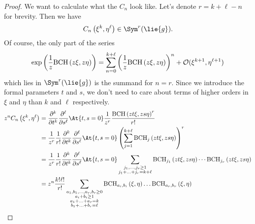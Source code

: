 \begin{proof}
	We want to calculate what the $C_n$ look like. Let's denote $r = k 
	+ \ell - n$ for brevity. Then we have
	\begin{equation*}
		C_n \left( \xi^k, \eta^{\ell} \right)
		\in \Sym^r(\lie{g}).
	\end{equation*}
	Of course, the only part of the series
	\begin{equation*}
		\exp\left(
			\frac{1}{z} \mathrm{BCH}\left(z \xi, z \eta\right)
		\right)
		=
		\sum\limits_{n = 0}^{k + \ell}
		\left(
			\frac{1}{z} \mathrm{BCH}\left(z \xi, z \eta\right)
		\right)^n
		+ \mathcal{O}(\xi^{k + 1}, \eta^{\ell + 1})
	\end{equation*} which lies in $\Sym^r(\lie{g})$ is the summand for 
	$n = r $. Since we introduce the formal parameters $t$ and $s$, we don't 
	need to care about terms of higher orders in $\xi$ and $\eta$ than $k$ 
	and $\ell$ respectively.
    \begin{align}
        \nonumber
        z^n C_n \left( \xi^k, \eta^{\ell} \right)
        & =
        \frac{\partial^k}{\partial t^k}
        \frac{\partial^{\ell}}{\partial s^{\ell}}
        \At{t,s = 0}
        \frac{1}{z^r}
        \frac{\bch{z t \xi}{z s \eta}^r    }{r!}
        \\
        \nonumber
        & =
        \frac{1}{z^r}
        \frac{1}{r!}
        \frac{\partial^k}{\partial t^k}
        \frac{\partial^{\ell}}{\partial s^{\ell}}
        \At{t,s = 0}
        \left(
            \sum\limits_{j = 1}^{k + \ell}
            \bchpart{j}{z t \xi}{z s \eta}
        \right)^r
        \\
        \nonumber
        & =
        \frac{1}{z^r}
        \frac{1}{r!}
        \frac{\partial^k}{\partial t^k}
        \frac{\partial^{\ell}}{\partial s^{\ell}}
        \At{t,s = 0}
        \sum\limits_{\substack{
        	j_1, \ldots, j_r \geq 1 \\
            j_1 + \ldots + j_r = k + \ell
        }}
        \bchpart{j_1}{z t \xi}{z s \eta} 
        \cdots
        \bchpart{j_r}{z t \xi}{z s \eta}
        \\
        \label{Formulas:2MonomialsExplicit}
        & =
        z^n
        \frac{k! \ell!}{r!}
        \sum\limits_{\substack{a_1, b_1, \ldots, a_r, b_r \geq 0 \\
            a_i + b_i \geq 1 \\
            a_1 + \ldots + a_r = k \\
            b_1 + \ldots + b_r = \ell
        }}
        \bchparts{a_i}{b_i}{\xi}{\eta}
        \ldots
        \bchparts{a_r}{b_r}{\xi}{\eta}

\end{align}
\end{proof}
